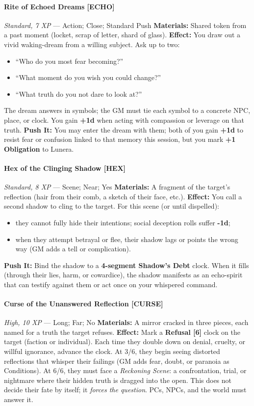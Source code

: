 \documentclass[11pt]{book}
\begin{document}
\paragraph{Rite of Echoed Dreams [ECHO]}
\emph{Standard, 7 XP} --- Action; Close; Standard Push  
\textbf{Materials:} Shared token from a past moment (locket, scrap of letter, shard of glass).  
\textbf{Effect:} You draw out a vivid waking-dream from a willing subject. Ask up to two:
\begin{itemize}[leftmargin=*]
  \item ``Who do you most fear becoming?''
  \item ``What moment do you wish you could change?''
  \item ``What truth do you not dare to look at?''
\end{itemize}
The dream answers in symbols; the GM must tie each symbol to a concrete NPC, place, or clock. You gain \textbf{+1d} when acting with compassion or leverage on that truth.  
\textbf{Push It:} You may enter the dream with them; both of you gain \textbf{+1d} to resist fear or confusion linked to that memory this session, but you mark \textbf{+1 Obligation} to Lunera.

\paragraph{Hex of the Clinging Shadow [HEX]}
\emph{Standard, 8 XP} --- Scene; Near; Yes  
\textbf{Materials:} A fragment of the target's reflection (hair from their comb, a sketch of their face, etc.).  
\textbf{Effect:} You call a second shadow to cling to the target. For this scene (or until dispelled):
\begin{itemize}[leftmargin=*]
  \item they cannot fully hide their intentions; social deception rolls suffer \textbf{-1d};
  \item when they attempt betrayal or flee, their shadow lags or points the wrong way (GM adds a tell or complication).
\end{itemize}
\textbf{Push It:} Bind the shadow to a \textbf{4-segment Shadow's Debt} clock. When it fills (through their lies, harm, or cowardice), the shadow manifests as an echo-spirit that can testify against them or act once on your whispered command.

\paragraph{Curse of the Unanswered Reflection [CURSE]}
\emph{High, 10 XP} --- Long; Far; No  
\textbf{Materials:} A mirror cracked in three pieces, each named for a truth the target refuses.  
\textbf{Effect:} Mark a \textbf{Refusal [6]} clock on the target (faction or individual). Each time they double down on denial, cruelty, or willful ignorance, advance the clock. At 3/6, they begin seeing distorted reflections that whisper their failings (GM adds fear, doubt, or paranoia as Conditions). At 6/6, they must face a \emph{Reckoning Scene}: a confrontation, trial, or nightmare where their hidden truth is dragged into the open.  
This does not decide their fate by itself; it \emph{forces the question}. PCs, NPCs, and the world must answer it.
\end{document}
